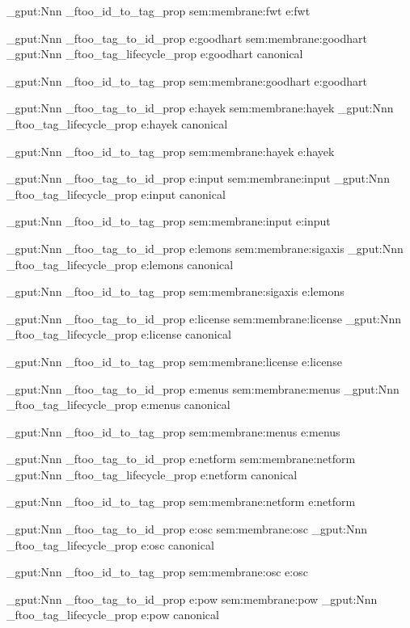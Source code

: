 \prop_gput:Nnn \g_ftoo_id_to_tag_prop { sem:membrane:fwt } { e:fwt }


\prop_gput:Nnn \g_ftoo_tag_to_id_prop { e:goodhart } { sem:membrane:goodhart }
\prop_gput:Nnn \g_ftoo_tag_lifecycle_prop { e:goodhart } { canonical }

\prop_gput:Nnn \g_ftoo_id_to_tag_prop { sem:membrane:goodhart } { e:goodhart }


\prop_gput:Nnn \g_ftoo_tag_to_id_prop { e:hayek } { sem:membrane:hayek }
\prop_gput:Nnn \g_ftoo_tag_lifecycle_prop { e:hayek } { canonical }

\prop_gput:Nnn \g_ftoo_id_to_tag_prop { sem:membrane:hayek } { e:hayek }


\prop_gput:Nnn \g_ftoo_tag_to_id_prop { e:input } { sem:membrane:input }
\prop_gput:Nnn \g_ftoo_tag_lifecycle_prop { e:input } { canonical }

\prop_gput:Nnn \g_ftoo_id_to_tag_prop { sem:membrane:input } { e:input }


\prop_gput:Nnn \g_ftoo_tag_to_id_prop { e:lemons } { sem:membrane:sigaxis }
\prop_gput:Nnn \g_ftoo_tag_lifecycle_prop { e:lemons } { canonical }

\prop_gput:Nnn \g_ftoo_id_to_tag_prop { sem:membrane:sigaxis } { e:lemons }


\prop_gput:Nnn \g_ftoo_tag_to_id_prop { e:license } { sem:membrane:license }
\prop_gput:Nnn \g_ftoo_tag_lifecycle_prop { e:license } { canonical }

\prop_gput:Nnn \g_ftoo_id_to_tag_prop { sem:membrane:license } { e:license }


\prop_gput:Nnn \g_ftoo_tag_to_id_prop { e:menus } { sem:membrane:menus }
\prop_gput:Nnn \g_ftoo_tag_lifecycle_prop { e:menus } { canonical }

\prop_gput:Nnn \g_ftoo_id_to_tag_prop { sem:membrane:menus } { e:menus }


\prop_gput:Nnn \g_ftoo_tag_to_id_prop { e:netform } { sem:membrane:netform }
\prop_gput:Nnn \g_ftoo_tag_lifecycle_prop { e:netform } { canonical }

\prop_gput:Nnn \g_ftoo_id_to_tag_prop { sem:membrane:netform } { e:netform }


\prop_gput:Nnn \g_ftoo_tag_to_id_prop { e:osc } { sem:membrane:osc }
\prop_gput:Nnn \g_ftoo_tag_lifecycle_prop { e:osc } { canonical }

\prop_gput:Nnn \g_ftoo_id_to_tag_prop { sem:membrane:osc } { e:osc }


\prop_gput:Nnn \g_ftoo_tag_to_id_prop { e:pow } { sem:membrane:pow }
\prop_gput:Nnn \g_ftoo_tag_lifecycle_prop { e:pow } { canonical }


